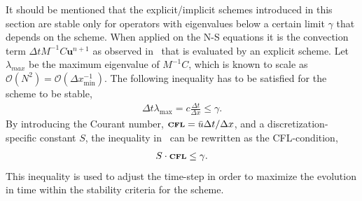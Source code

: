 


It should be mentioned that the explicit/implicit schemes introduced in this section are 
stable only for operators with eigenvalues below a certain limit $\gamma$ that depends 
on the scheme. When applied on the N-S 
equations it is the convection term $\Delta t M^{-1}C\mathbf{u}^{n+1}$
as observed in~ that is evaluated by
an explicit scheme. Let $\lambda_{max}$ be the maximum eigenvalue of
$M^{-1}C$, which is known to scale as 
$\mathcal{O}(N^{2})=\mathcal{O}(\Delta x_{\min}^{-1})$. The following inequality 
has to be satisfied for the scheme to be stable, 
%
\begin{align}
    \Delta t \lambda_{\max} = c\frac{\Delta t}{\Delta x} \le \gamma.
    \label{eq:restriction}
\end{align}
%
By introducing the Courant number, $\mbox{\scriptsize{\bf{CFL}}} = \bar u \Delta t/ \Delta x$,
and a discretization-specific constant $S$, the inequality in~ 
can be rewritten as the CFL-condition,
%
\begin{align}
    S \cdot \mbox{\scriptsize{\bf{CFL}}}   \le \gamma.
    \label{eq:CFLcondition}
\end{align}
%
This inequality is used to adjust the time-step in order to maximize the evolution in time 
within the stability criteria for the scheme.

